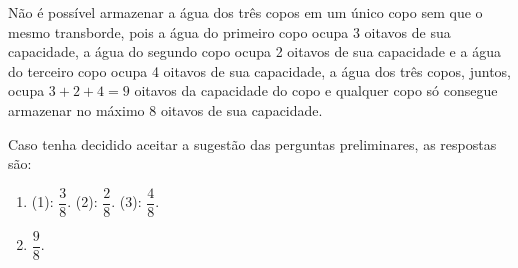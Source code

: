 \begin{solucao}{}{}
  Não é possível armazenar a água dos três copos em um único copo sem que o mesmo transborde, pois a água do primeiro copo ocupa 3 oitavos de sua capacidade, a água do segundo copo ocupa 2 oitavos de sua capacidade e a água do terceiro copo ocupa 4 oitavos de sua capacidade, a água dos três copos, juntos, ocupa       $3 + 2 + 4 = 9$ oitavos da capacidade do copo e qualquer copo só consegue armazenar no máximo $8$ oitavos de sua capacidade.

  Caso tenha decidido aceitar a sugestão das perguntas preliminares, as respostas são:
\begin{enumerate} [\quad a)] %
    \item       (1):       $\dfrac{3}{8}$. (2):       $\dfrac{2}{8}$. (3):       $\dfrac{4}{8}$.
    \item             $\dfrac{9}{8}$.
\end{enumerate} %

\end{solucao}

